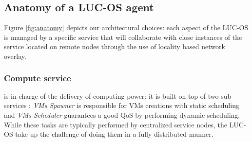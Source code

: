 \subsection{Anatomy of a LUC-OS agent}


\label{sec:anatomy_lucos}
Figure \ref{fig:anatomy} depicts our architectural choices: each aspect of the 
LUC-OS is managed by a specific service that will collaborate with close 
instances of the service located on remote nodes through the use of locality
based network overlay. 

\subsubsection{Compute service}
is in charge of the delivery of computing power: it is built on top of two 
sub-services : \emph{VMs Spawner} is responsible for VMs creations with static 
scheduling and \emph{VMs Scheduler} guarantees a good QoS by performing dynamic 
scheduling. While these tasks are typically performed by centralized service 
nodes, the LUC-OS take up the challenge of doing them in a fully distributed
manner.

